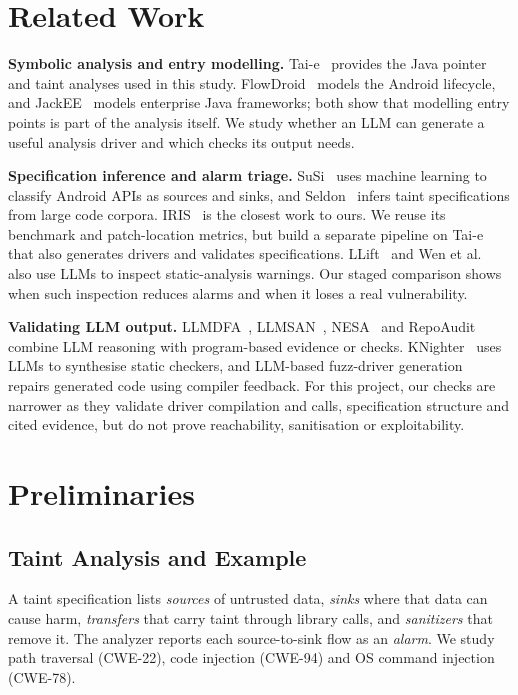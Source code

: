 \documentclass[sigconf]{acmart}
\newcommand{\cwe}[1]{CWE-#1}
\begin{document}
\section{Related Work}
\label{sec:related}
\textbf{Symbolic analysis and entry modelling.} Tai-e~\cite{tan2023taie} provides the Java pointer and taint analyses used in this study. FlowDroid~\cite{arzt2014flowdroid} models the Android lifecycle, and JackEE~\cite{antoniadis2020jackee} models enterprise Java frameworks; both show that modelling entry points is part of the analysis itself. We study whether an LLM can generate a useful analysis driver and which checks its output needs.

\textbf{Specification inference and alarm triage.} SuSi~\cite{rasthofer2014susi} uses machine learning to classify Android APIs as sources and sinks, and Seldon~\cite{chibotaru2019seldon} infers taint specifications from large code corpora. IRIS~\cite{li2025iris} is the closest work to ours. We reuse its benchmark and patch-location metrics, but build a separate pipeline on Tai-e that also generates drivers and validates specifications. LLift~\cite{li2024llift} and Wen et al.~\cite{wen2024llm4sa} also use LLMs to inspect static-analysis warnings. Our staged comparison shows when such inspection reduces alarms and when it loses a real vulnerability.

\textbf{Validating LLM output.} LLMDFA~\cite{wang2024llmdfa}, LLMSAN~\cite{wang2024llmsan}, NESA~\cite{wang2024nesa} and RepoAudit~\cite{guo2025repoaudit} combine LLM reasoning with program-based evidence or checks. KNighter~\cite{yang2025knighter} uses LLMs to synthesise static checkers, and LLM-based fuzz-driver generation~\cite{zhang2024fuzzdriver} repairs generated code using compiler feedback. For this project, our checks are narrower as they validate driver compilation and calls, specification structure and cited evidence, but do not prove reachability, sanitisation or exploitability.

\section{Preliminaries}
\label{sec:prelim}
\subsection{Taint Analysis and Example}
A taint specification lists \emph{sources} of untrusted data, \emph{sinks} where that data can cause harm, \emph{transfers} that carry taint through library calls, and \emph{sanitizers} that remove it. The analyzer reports each source-to-sink flow as an \emph{alarm}. We study path traversal (\cwe{22}), code injection (\cwe{94}) and OS command injection (\cwe{78}).
\end{document}
